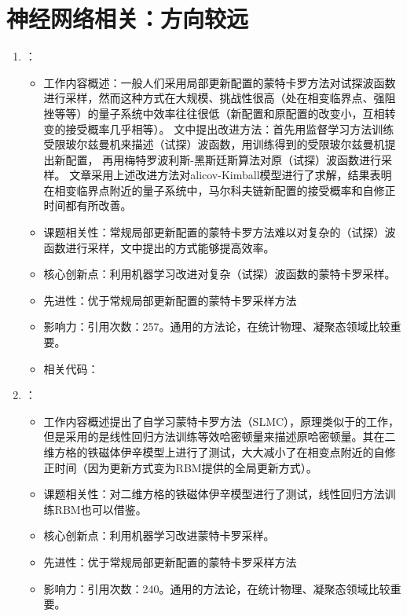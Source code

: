 \section{神经网络相关：方向较远}
    \begin{enumerate}
        \item \citet{huang2017accelerated}：
        \begin{itemize}
            \item 工作内容概述：一般人们采用局部更新配置的蒙特卡罗方法对试探波函数进行采样，然而这种方式在大规模、挑战性很高（处在相变临界点、强阻挫等等）的量子系统中效率往往很低（新配置和原配置的改变小，互相转变的接受概率几乎相等）。
            文中提出改进方法：首先用监督学习方法训练受限玻尔兹曼机来描述（试探）波函数，用训练得到的受限玻尔兹曼机提出新配置，
            再用梅特罗波利斯-黑斯廷斯算法\citep{metropolis1953equation, hastings1970monte}对原（试探）波函数进行采样。
            文章采用上述改进方法对alicov-Kimball模型\citep{falicov1969simple}进行了求解，结果表明在相变临界点附近的量子系统中，马尔科夫链新配置的接受概率和自修正时间都有所改善。
            \item 课题相关性：常规局部更新配置的蒙特卡罗方法难以对复杂的（试探）波函数进行采样，文中提出的方式能够提高效率。
            \item 核心创新点：利用机器学习改进对复杂（试探）波函数的蒙特卡罗采样。
            \item 先进性：优于常规局部更新配置的蒙特卡罗采样方法
            \item 影响力：引用次数：257。通用的方法论，在统计物理、凝聚态领域比较重要。
            \item 相关代码：
        \end{itemize}
        \item \citet{liu2017self}：
        \begin{itemize}
            \item 工作内容概述提出了自学习蒙特卡罗方法（SLMC），原理类似于\citet{huang2017accelerated}的工作，但是采用的是线性回归方法训练等效哈密顿量来描述原哈密顿量。其在二维方格的铁磁体伊辛模型上进行了测试，大大减小了在相变点附近的自修正时间（因为更新方式变为RBM提供的全局更新方式）。
            \item 课题相关性：对二维方格的铁磁体伊辛模型进行了测试，线性回归方法训练RBM也可以借鉴。
            \item 核心创新点：利用机器学习改进蒙特卡罗采样。
            \item 先进性：优于常规局部更新配置的蒙特卡罗采样方法
            \item 影响力：引用次数：240。通用的方法论，在统计物理、凝聚态领域比较重要。

\end{itemize}
\end{enumerate}
